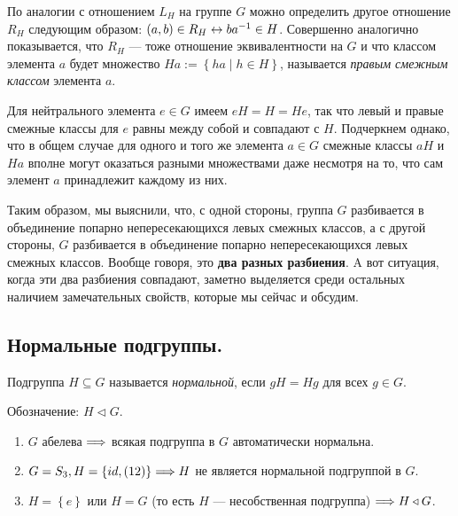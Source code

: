 \mysection
По аналогии с отношением $L_H$ на группе $G$ можно определить другое отношение
$R_H$ следующим образом: $(a, b) \in R_H \leftrightarrow ba^{-1} \in H$.
Совершенно аналогично показывается, что $R_H$ --- тоже отношение
эквивалентности на $G$ и что классом элемента $a$ будет множество
$Ha := \left\{ ha \mid h \in H \right\}$, называется 
\textit{правым смежным классом} элемента $a$.

Для нейтрального элемента $e \in G$ имеем $eH = H = He$, так что левый и
правые смежные классы для $e$ равны между собой и совпадают с $H$. 
Подчеркнем однако, что в общем случае для одного и того же элемента 
$a \in G$ смежные классы $aH$ и $Ha$ 
вполне могут оказаться разными множествами даже несмотря на то, 
что сам элемент $a$ принадлежит каждому из них.

Таким образом, мы выяснили, что, с одной стороны, группа $G$ 
разбивается в объединение попарно непересекающихся левых смежных классов,
а с другой стороны, $G$ разбивается в объединение попарно 
непересекающихся левых смежных классов.
Вообще говоря, это \textbf{два разных разбиения}.
A вот ситуация, когда эти два разбиения совпадают, заметно выделяется среди
остальных наличием замечательных свойств, которые мы сейчас и обсудим.

\subsection{Нормальные подгруппы.}


\begin{definition}
    Подгруппа $H \subseteq G$ называется \textit{нормальной},
    если $gH = Hg$ для всех $g \in G$.
\end{definition}

Обозначение: $H \triangleleft G$.

\begin{example}[ы] \vspace{-0.3cm}
    \begin{enumerate}[label = \arabic*)]
        \item $G$ абелева $\Longrightarrow$ всякая подгруппа в $G$ автоматически нормальна.
        \item $G = S_3, H = \left\{ id, (12) \right\} \Longrightarrow H$
        не является нормальной подгруппой в $G$.
        \item $H = \left\{ e \right\}$ или $H = G$ 
        (то есть $H$ --- несобственная подгруппа) $\Longrightarrow H \triangleleft G$.
    \end{enumerate}
\end{example}

